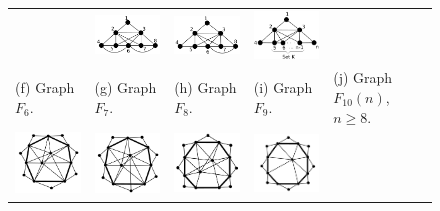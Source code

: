 \begin{figure}[htb]
\begin{tabular}{  p{2.7cm} p{2.7cm} p{2.7cm} p{2.7cm} p{2.7cm} }
    & 
    \includegraphics[width=3cm]{img/f8.png} 
    & 
    \includegraphics[width=3cm]{img/f9.png} 
    & 
    \includegraphics[width=3cm]{img/f10n2.png} 
    \\ %
    \footnotesize 
    (f)  \footnotesize Graph $F_6$. 
    & 
    \footnotesize (g) Graph $F_7$.
    & 
    \footnotesize (h) Graph $F_8$.
    & 
    \footnotesize (i) Graph $F_9$.
    & 
    \footnotesize (j) Graph $F_{10}(n)$, $n\geq  8$.
    \\%
        \includegraphics[width=3cm]{img/f11.png} 
    & 
    \includegraphics[width=3cm]{img/f12.png} 
    & 
    \includegraphics[width=3cm]{img/f13.png} 
    & 
    \includegraphics[width=3cm]{img/f14.png} 

\end{tabular}
\end{figure}
